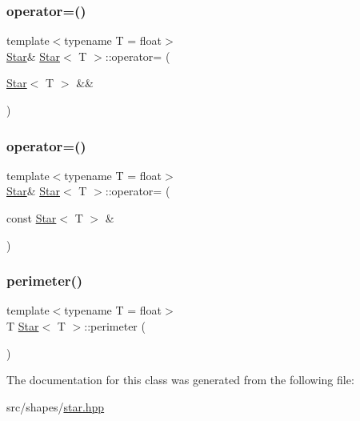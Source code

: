 \subsubsection{\texorpdfstring{operator=()}{operator=()}\hspace{0.1cm}{\footnotesize\ttfamily [1/2]}}
{\footnotesize\ttfamily template$<$typename T  = float$>$ \\
\mbox{\hyperlink{classStar}{Star}}\& \mbox{\hyperlink{classStar}{Star}}$<$ T $>$\+::operator= (\begin{DoxyParamCaption}\item[{\mbox{\hyperlink{classStar}{Star}}$<$ T $>$ \&\&}]{ }\end{DoxyParamCaption})\hspace{0.3cm}{\ttfamily [default]}}

\mbox{\label{classStar_a3507f157448e082ccfcadc4783f2610e}} 
\subsubsection{\texorpdfstring{operator=()}{operator=()}\hspace{0.1cm}{\footnotesize\ttfamily [2/2]}}
{\footnotesize\ttfamily template$<$typename T  = float$>$ \\
\mbox{\hyperlink{classStar}{Star}}\& \mbox{\hyperlink{classStar}{Star}}$<$ T $>$\+::operator= (\begin{DoxyParamCaption}\item[{const \mbox{\hyperlink{classStar}{Star}}$<$ T $>$ \&}]{ }\end{DoxyParamCaption})\hspace{0.3cm}{\ttfamily [default]}}

\mbox{\label{classStar_a908253192d0b1fe95aeeaa81322545bf}} 
\subsubsection{\texorpdfstring{perimeter()}{perimeter()}}
{\footnotesize\ttfamily template$<$typename T  = float$>$ \\
T \mbox{\hyperlink{classStar}{Star}}$<$ T $>$\+::perimeter (\begin{DoxyParamCaption}{ }\end{DoxyParamCaption})}



The documentation for this class was generated from the following file\+:\begin{DoxyCompactItemize}
\item 
src/shapes/\mbox{\hyperlink{star_8hpp}{star.\+hpp}}\end{DoxyCompactItemize}
